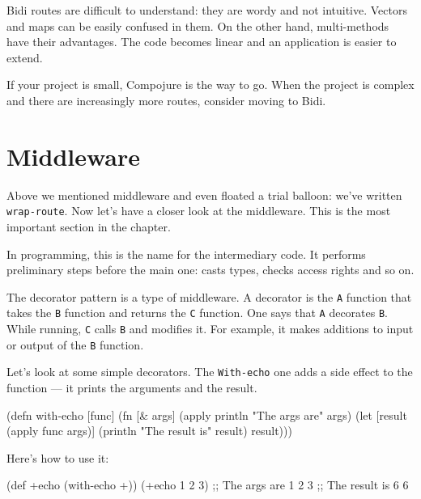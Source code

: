 Bidi routes are difficult to understand: they are wordy and not intuitive. Vectors and maps can be easily confused in them. On the other hand, multi-methods have their advantages. The code becomes linear and an application is easier to extend.

If your project is small, Compojure is the way to go. When the project is complex and there are increasingly more routes, consider moving to Bidi.

\section{Middleware}


Above we mentioned middleware and even floated a trial balloon: we've written \verb|wrap-route|. Now let's have a closer look at the middleware. This is the most important section in the chapter.

In programming, this is the name for the intermediary code. It performs preliminary steps before the main one: casts types, checks access rights and so on.

\label{decorator}


The decorator pattern is a type of middleware. A decorator is the \verb|A| function that takes the \verb|B| function and returns the \verb|C| function. One says that \verb|A| decorates \verb|B|. While running, \verb|C| calls \verb|B| and modifies it. For example, it makes additions to input or output of the \verb|B| function.

Let's look at some simple decorators. The \verb|With-echo| one adds a side effect to the function — it prints the arguments and the result.

\begin{english}
  \begin{clojure}
(defn with-echo [func]
  (fn [& args]
    (apply println "The args are" args)
    (let [result (apply func args)]
      (println "The result is" result)
      result)))
  \end{clojure}
\end{english}

Here's how to use it:

\begin{english}
  \begin{clojure}
(def +echo (with-echo +))
(+echo 1 2 3)
;; The args are 1 2 3
;; The result is 6
6
  \end{clojure}
\end{english}

